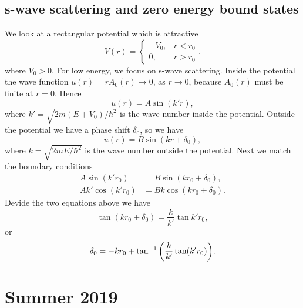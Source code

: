 \documentclass[10pt]{article}
\begin{document}
\subsection{s-wave scattering and zero energy bound states}
We look at a rectangular potential which is attractive
\begin{equation}
	V(r) =
	\begin{cases}
			-V_0,& r<r_0 \\
			0,& r>r_0
	\end{cases}.
\end{equation}
where $V_0 >0$. For low energy, we focus on s-wave scattering. Inside the potential the wave function $u(r) = r A_0(r) \to 0$, as $r\to 0$, because $A_0(r)$ must be finite at $r = 0$. Hence
\begin{equation}
	u(r) = A \sin(k'r),
\end{equation}
where $k' = \sqrt{2m(E+V_0)/\hbar^2}$ is the wave number inside the potential. Outside the potential we have a phase shift $\delta_0$, so we have
\begin{equation}
	u(r) = B \sin(kr + \delta_0),
\end{equation}
where $k = \sqrt{2mE/\hbar^2}$ is the wave number outside the potential. Next we match the boundary conditions
\begin{align*}
	A \sin(k'r_0) &= B \sin(kr_0 + \delta_0), \\
	A k' \cos(k' r_0) &= B k \cos(kr_0 + \delta_0).
\end{align*}
Devide the two equations above we have
\begin{equation}
	\tan(kr_0 + \delta_0) = \frac{k}{k'} \tan{k' r_0},
\end{equation}
or
\begin{equation}
	\delta_0 = -kr_0 + \tan^{-1}\qty(\frac{k}{k'}\tan(k'r_0)).
\end{equation}
\section{Summer 2019}
\end{document}
